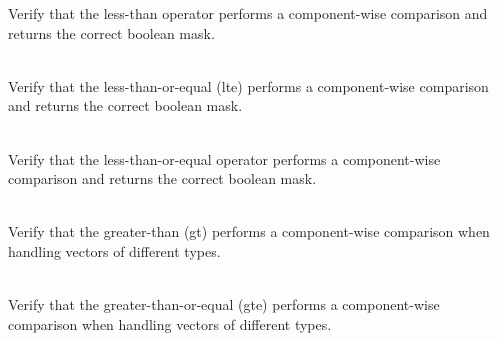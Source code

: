 \begin{DoxyRefList}
\label{test__test000056}%
%
Verify that the  less-\/than operator performs a component-\/wise comparison and returns the correct boolean mask.  
\item[{\parbox[t]{\linewidth}{Member \doxylink{group___f_g_m___vec4___l_t_e___comp_ga2e2e5a805eb80f6722810a2d5b611e15}{Vector4\+DComparison\+\_\+\+Less\+Than\+Or\+Equal\+\_\+\+Returns\+Boolean\+Vector\+With\+Elements\+Less\+Than\+Or\+Equal\+As\+True} ()}}]\hfill \\
\label{test__test000061}%
%
Verify that the  less-\/than-\/or-\/equal (lte) performs a component-\/wise comparison and returns the correct boolean mask.  
\item[{\parbox[t]{\linewidth}{Member \doxylink{group___f_g_m___vec4___l_t_e___comp_ga9c2535b935f8626b207d20be6c414701}{Vector4\+DComparison\+\_\+\+Less\+Than\+Or\+Equal\+Operator\+\_\+\+Returns\+Boolean\+Vector\+With\+Elements\+Less\+Than\+Or\+Equal\+As\+True} ()}}]\hfill \\
\label{test__test000062}%
%
Verify that the  less-\/than-\/or-\/equal operator performs a component-\/wise comparison and returns the correct boolean mask.  
\item[{\parbox[t]{\linewidth}{Member \doxylink{group___f_g_m___vec4___g_t___comp_ga01af216d9cd55739cb9eb63221a8f516}{Vector4\+DComparison\+\_\+\+Mixed\+Type\+\_\+\+Greater\+Than\+\_\+\+Returns\+Boolean\+Vector\+With\+Correct\+Values} ()}}]\hfill \\
\label{test__test000048}%
%
Verify that the  greater-\/than (gt) performs a component-\/wise comparison when handling vectors of different types.  
\item[{\parbox[t]{\linewidth}{Member \doxylink{group___f_g_m___vec4___g_t_e___comp_ga9d5793aa6315ed836be0c04b05fe17f0}{Vector4\+DComparison\+\_\+\+Mixed\+Type\+\_\+\+Greater\+Than\+Or\+Equal\+\_\+\+Returns\+Boolean\+Vector\+With\+Correct\+Values} ()}}]\hfill \\
\label{test__test000054}%
%
Verify that the  greater-\/than-\/or-\/equal (gte) performs a component-\/wise comparison when handling vectors of different types.  
\item[{\parbox[t]{\linewidth}{Member \doxylink{group___f_g_m___vec4___l_t___comp_ga5205f88615eb7aceacd127676c9e97f9}{Vector4\+DComparison\+\_\+\+Mixed\+Type\+\_\+\+Less\+Than\+\_\+\+Returns\+Boolean\+Vector\+With\+Correct\+Values} ()}}]\hfill \\

\end{DoxyRefList}

